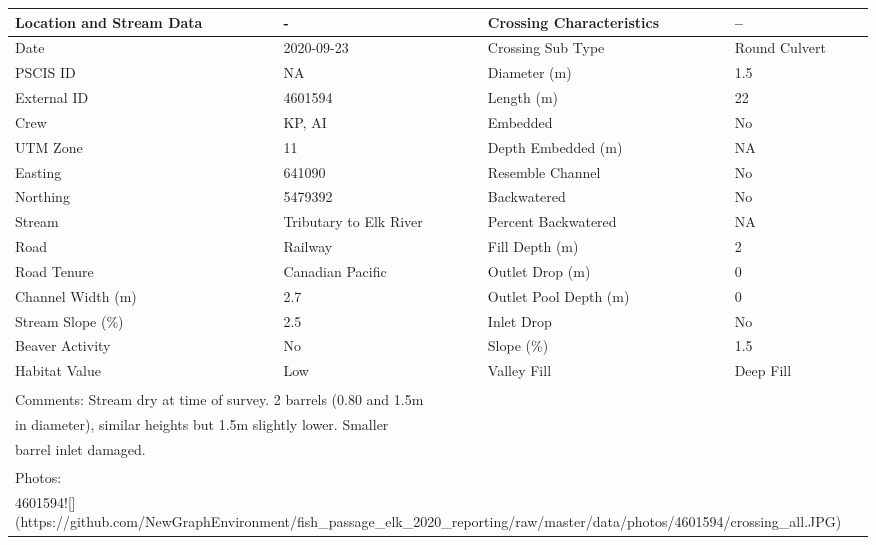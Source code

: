 \documentclass[
]{book}
\begin{document}
\begin{tabular}{l|l|l|l}
\hline
Location and Stream Data & - & Crossing Characteristics & --\\
\hline
Date & 2020-09-23 & Crossing Sub Type & Round Culvert\\
\hline
PSCIS ID & NA & Diameter (m) & 1.5\\
\hline
External ID & 4601594 & Length (m) & 22\\
\hline
Crew & KP, AI & Embedded & No\\
\hline
UTM Zone & 11 & Depth Embedded (m) & NA\\
\hline
Easting & 641090 & Resemble Channel & No\\
\hline
Northing & 5479392 & Backwatered & No\\
\hline
Stream & Tributary to Elk River & Percent Backwatered & NA\\
\hline
Road & Railway & Fill Depth (m) & 2\\
\hline
Road Tenure & Canadian Pacific & Outlet Drop (m) & 0\\
\hline
Channel Width (m) & 2.7 & Outlet Pool Depth (m) & 0\\
\hline
Stream Slope (\%) & 2.5 & Inlet Drop & No\\
\hline
Beaver Activity & No & Slope (\%) & 1.5\\
\hline
Habitat Value & Low & Valley Fill & Deep Fill\\
\hline
\multicolumn{4}{l}{\textsuperscript{} Comments: Stream dry at time of survey. 2 barrels (0.80 and 1.5m}\\
\multicolumn{4}{l}{in diameter), similar heights but 1.5m slightly lower. Smaller}\\
\multicolumn{4}{l}{barrel inlet damaged.}\\
\multicolumn{4}{l}{\textsuperscript{} Photos:}\\
\multicolumn{4}{l}{4601594![](https://github.com/NewGraphEnvironment/fish\_passage\_elk\_2020\_reporting/raw/master/data/photos/4601594/crossing\_all.JPG)}\\
\end{tabular}
\end{document}
